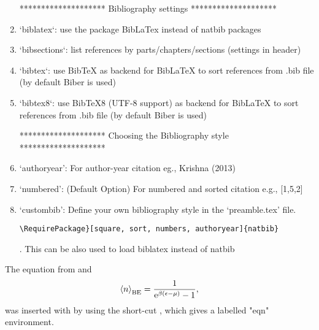 \begin{enumerate}
\begin{center}
******************** Bibliography settings ********************
\end{center}
\item`biblatex`: use the package BibLaTex instead of natbib packages

\item`bibsections`: list references by parts/chapters/sections (settings in header)

\item`bibtex`: use BibTeX as backend for BibLaTeX to sort references from .bib file (by default Biber is used)

\item`bibtex8`: use BibTeX8 (UTF-8 support) as backend for BibLaTeX to sort references from .bib file (by default Biber is used)

\begin{center}
******************** Choosing the Bibliography style ********************
\end{center}
\item`authoryear': For author-year citation eg., Krishna (2013)

\item`numbered': (Default Option) For numbered and sorted citation e.g., [1,5,2]

\item`custombib': Define your own bibliography style in the `preamble.tex' file.
              \begin{verbatim}\RequirePackage}[square, sort, numbers, authoryear]{natbib} \end{verbatim}.
              This can be also used to load biblatex instead of natbib
              
\end{enumerate}



The equation from \autocite{Einstein1924, Einstein1925} and \autocite{deBroglie1929}
\begin{equation}\label{eqn:bose_einstein_distribution}
	\left\langle n \right\rangle_\mathrm{BE}=\frac{1}{\mathrm{e}^{\beta \left( \epsilon - \mu \right) } - 1},
\end{equation}
was inserted with by using the short-cut , which gives a labelled "eqn" environment.